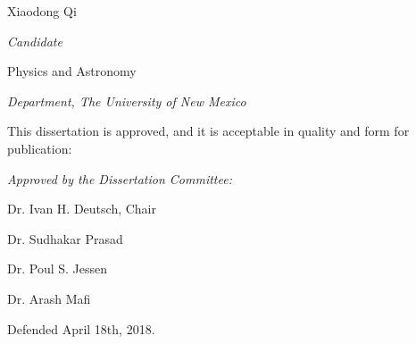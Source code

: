 \documentclass[letterpaper,12pt]{article}
\begin{document}
 \begin{Large}
 \noindent Xiaodong Qi 
 \vspace{-0.2in}
 \end{Large}

 \noindent\makebox[\linewidth][l]{\rule{3.1in}{1pt}}
  \textit{Candidate} \vspace{0.2in}
 
 \begin{Large}
 \noindent Physics and Astronomy
 \vspace{-0.2in}
 \end{Large}
 
  \noindent\makebox[\linewidth][l]{\rule{3.1in}{1pt}} 
    \textit{Department, The University of New Mexico} \vspace{0.2in}
 
 
   \noindent This dissertation is approved, and it is acceptable in quality and form for publication: \vspace{0.2in}
\begin{large}
 \noindent \textit{Approved by the Dissertation Committee:} \vspace{0.45in}
 \end{large}
 


 \noindent\makebox[\linewidth]{\rule{5.5in}{1pt}}
 
  \hfill Dr. Ivan H. Deutsch, Chair \vspace{0.35in}
  
  

  \noindent\makebox[\linewidth]{\rule{5.5in}{1pt}}
   
   \hfill Dr. Sudhakar Prasad  \vspace{0.35in}
 
 
  \noindent\makebox[\linewidth]{\rule{5.5in}{1pt}}
  
    \hfill Dr. Poul S. Jessen  \vspace{0.35in}
 
 

  \noindent\makebox[\linewidth]{\rule{5.5in}{1pt}}
    
    \hfill Dr. Arash Mafi  \vspace{0.05in}
    
      
Defended April 18th, 2018.
 
\end{document}
